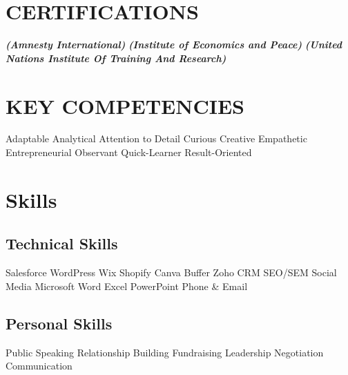 \documentclass[]{aj-resume-openfont}
\begin{document}
\begin{minipage}[t]{0.33\textwidth}
\section{CERTIFICATIONS} 
 \newline 
{\footnotesize \textit{\textbf{(Amnesty International) }}} \newline 
{} \newline 
{\footnotesize \textit{\textbf{(Institute of Economics and Peace) }}} \newline
{} \newline 
{\footnotesize \textit{\textbf{(United Nations Institute Of
Training And Research) }}}
\sectionsep


\section{KEY COMPETENCIES} 
\textbullet{} Adaptable
\textbullet{} Analytical
\textbullet{} Attention to Detail
\textbullet{} Curious
\textbullet{} Creative
\textbullet{} Empathetic
\textbullet{} Entrepreneurial
\textbullet{} Observant\newline 
\textbullet{} Quick-Learner 
\textbullet{} Result-Oriented
\sectionsep


\section{Skills}
\subsection{Technical Skills}
\textbullet{}Salesforce
\textbullet{}WordPress
\textbullet{}Wix
\textbullet{}Shopify
\textbullet{}Canva
\textbullet{}Buffer
\textbullet{}Zoho
\textbullet{}CRM
\textbullet{}SEO/SEM
\textbullet{}Social Media
\textbullet{}Microsoft Word
\textbullet{}Excel
\textbullet{}PowerPoint
\textbullet{}Phone \& Email
\sectionsep
\subsection{Personal Skills}
\textbullet{} Public Speaking 
\textbullet{} Relationship Building
\textbullet{} Fundraising
\textbullet{} Leadership
\textbullet{} Negotiation
\textbullet{} Communication
\sectionsep

%
%

\end{minipage} 
\end{document}
